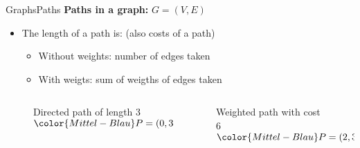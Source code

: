 
\begin{frame}{Graphs}{Paths}
  \textbf{Paths in a graph:}
  {\color{Mittel-Blau}$G = (V , E)$}
  \begin{itemize}
    \item<2->
      The {\color{Mittel-Blau}length of a path} is:
      (also costs of a path)
      \begin{itemize}
        \item<3->
          Without weights:
          {\color{Mittel-Blau}number of edges} taken
        \item<4->
          With weigts:
          {\color{Mittel-Blau}sum of weigths of edges} taken
      \end{itemize}
  \end{itemize}
  \begin{columns}
    \begin{column}[b]{0.5\linewidth}
      \begin{figure}
        \begin{adjustbox}{width=0.95\linewidth}
          
        \end{adjustbox}
        \caption{{\color{Mittel-Blau}Directed path} of length 3 \newline
          ${\color{Mittel-Blau}P} = (0, 3, 1, 4)$}
        \label{fig:graphs:directed_path_length}
      \end{figure}
    \end{column}
    \begin{column}[b]{0.5\linewidth}
      \begin{figure}
        \begin{adjustbox}{width=0.8\linewidth}
          
        \end{adjustbox}
        \caption{{\color{Mittel-Blau}Weighted path} with cost 6 \newline
          ${\color{Mittel-Blau}P} = (2, 3, 1)$}
        \label{fig:graphs:weighted_path_length}
      \end{figure}
    \end{column}
  \end{columns}
\end{frame}


